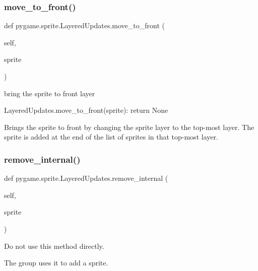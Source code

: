 \subsubsection{\texorpdfstring{move\+\_\+to\+\_\+front()}{move\_to\_front()}}
{\footnotesize\ttfamily def pygame.\+sprite.\+Layered\+Updates.\+move\+\_\+to\+\_\+front (\begin{DoxyParamCaption}\item[{}]{self,  }\item[{}]{sprite }\end{DoxyParamCaption})}

\begin{DoxyVerb}bring the sprite to front layer

LayeredUpdates.move_to_front(sprite): return None

Brings the sprite to front by changing the sprite layer to the top-most
layer. The sprite is added at the end of the list of sprites in that
top-most layer.\end{DoxyVerb}
 \mbox{\label{classpygame_1_1sprite_1_1_layered_updates_af7e25a22639a30a8686f660866fd406e}} 
\subsubsection{\texorpdfstring{remove\+\_\+internal()}{remove\_internal()}}
{\footnotesize\ttfamily def pygame.\+sprite.\+Layered\+Updates.\+remove\+\_\+internal (\begin{DoxyParamCaption}\item[{}]{self,  }\item[{}]{sprite }\end{DoxyParamCaption})}

\begin{DoxyVerb}Do not use this method directly.

The group uses it to add a sprite.\end{DoxyVerb}
 \mbox{\label{classpygame_1_1sprite_1_1_layered_updates_a5aa0b60731bd14f90548aeeb956a4cf3}} 
